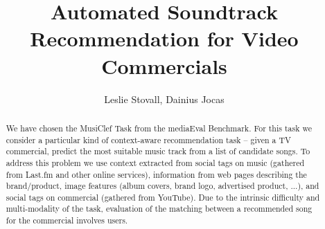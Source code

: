 \documentclass{llncs}
\author{Leslie Stovall, Dainius Jocas}
\institute{Free University of Bozen-Bolzano}
\title{Automated Soundtrack Recommendation for Video Commercials}
\begin{document}
  


\maketitle



  
\begin{abstract}
We have chosen the MusiClef Task from the mediaEval Benchmark. For this task we consider a particular kind of context-aware recommendation task -- given a TV commercial, predict the most suitable music track from a list of candidate songs. To address this problem we use context extracted from social tags on music (gathered from Last.fm and other online services), information from web pages describing the brand/product, image features (album covers, brand logo, advertised product, ...), and social tags on commercial (gathered from YouTube). Due to the intrinsic difficulty and multi-modality of the task, evaluation of the matching between a recommended song for the commercial involves users.
\end{abstract}

  
\end{document}

